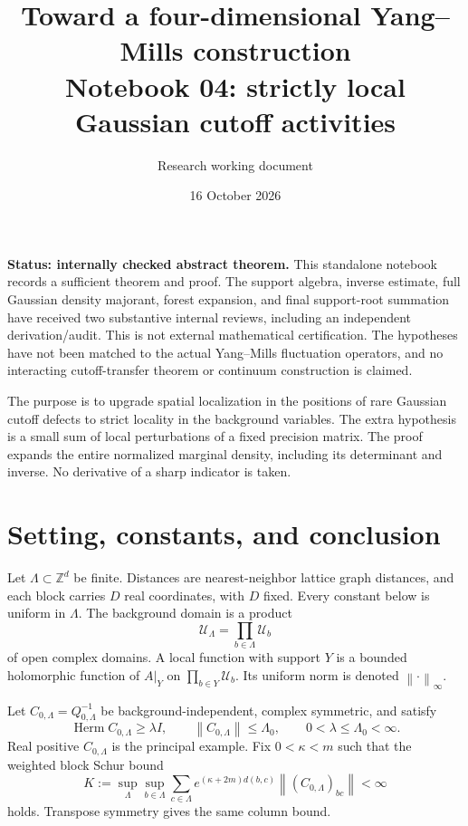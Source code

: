 \documentclass[11pt]{article}
\title{Toward a four-dimensional Yang--Mills construction\\
\large Notebook 04: strictly local Gaussian cutoff activities}
\author{Research working document}
\date{16 October 2026}
\newcommand{\Herm}{\operatorname{Herm}}
\newcommand{\Z}{\mathbb Z}
\newcommand{\norm}[1]{\left\|#1\right\|}
\begin{document}
\maketitle

\noindent\textbf{Status: internally checked abstract theorem.}
This standalone notebook records a sufficient theorem and proof. The support
algebra, inverse estimate, full Gaussian density majorant, forest expansion,
and final support-root summation have received two substantive internal
reviews, including an independent derivation/audit. This is not external
mathematical certification. The hypotheses have not been matched to the
actual Yang--Mills fluctuation operators, and no interacting cutoff-transfer
theorem or continuum construction is claimed.

\medskip
\noindent
The purpose is to upgrade spatial localization in the positions of rare
Gaussian cutoff defects to strict locality in the background variables.
The extra hypothesis is a small sum of local perturbations of a fixed
precision matrix. The proof expands the entire normalized marginal density,
including its determinant and inverse. No derivative of a sharp indicator
is taken.

\section{Setting, constants, and conclusion}

Let $\Lambda\subset\Z^d$ be finite. Distances are nearest-neighbor lattice
graph distances, and each block carries $D$ real coordinates, with $D$ fixed.
Every constant below is uniform in $\Lambda$. The background domain is a
product
\[
 \mathcal U_\Lambda=\prod_{b\in\Lambda}\mathcal U_b
\]
of open complex domains. A local function with support $Y$ is a bounded
holomorphic function of $A|_Y$ on $\prod_{b\in Y}\mathcal U_b$.
Its uniform norm is denoted $\norm{\cdot}_\infty$.

Let $C_{0,\Lambda}=Q_{0,\Lambda}^{-1}$ be background-independent, complex
symmetric, and satisfy
\begin{equation}
 \Herm C_{0,\Lambda}\ge\lambda I,\qquad
 \norm{C_{0,\Lambda}}\le\Lambda_0,
 \qquad 0<\lambda\le\Lambda_0<\infty.
 \label{eq:baseline-gap}
\end{equation}
Real positive $C_{0,\Lambda}$ is the principal example. Fix $0<\kappa<m$
such that the weighted block Schur bound
\begin{equation}
 K:=\sup_\Lambda\sup_{b\in\Lambda}
       \sum_{c\in\Lambda}
       e^{(\kappa+2m)d(b,c)}\norm{(C_{0,\Lambda})_{bc}}
       <\infty
 \label{eq:baseline-decay}
\end{equation}
holds. Transpose symmetry gives the same column bound.
\end{document}
